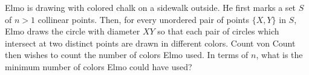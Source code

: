 Elmo is drawing with colored chalk on a sidewalk outside. He first marks a set $S$ of $n>1$ collinear points. Then, for every unordered pair of points $\{X,Y\}$ in $S$, Elmo draws the circle with diameter $XY$ so that each pair of circles which intersect at two distinct points are drawn in different colors. Count von Count then wishes to count the number of colors Elmo used. In terms of $n$, what is the minimum number of colors Elmo could have used?